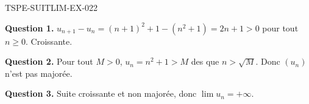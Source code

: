 \begin{corrige}{TSPE-SUITLIM-EX-022}

\textbf{Question 1.} $u_{n+1} - u_n = (n+1)^2+1-(n^2+1) = 2n+1 > 0$ pour tout $n \geq 0$. Croissante.

\textbf{Question 2.} Pour tout $M > 0$, $u_n = n^2+1 > M$ des que $n > \sqrt{M}$. Donc $(u_n)$ n'est pas majorée.

\textbf{Question 3.} Suite croissante et non majorée, donc $\boxed{\lim u_n = +\infty}$.

\end{corrige}
